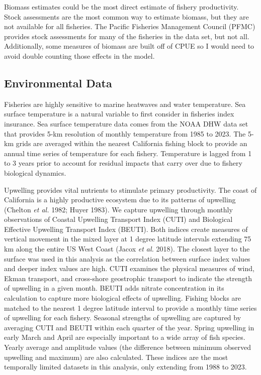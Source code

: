 \documentclass[
  letterpaper,
  DIV=11,
  numbers=noendperiod]{scrartcl}
\begin{document}
Biomass estimates could be the most direct estimate of fishery
productivity. Stock assessments are the most common way to estimate
biomass, but they are not available for all fisheries. The Pacific
Fisheries Management Council (PFMC) provides stock assessments for many
of the fisheries in the data set, but not all. Additionally, some
measures of biomass are built off of CPUE so I would need to avoid
double counting those effects in the model.

\hypertarget{environmental-data}{%
\subsection{Environmental Data}\label{environmental-data}}

Fisheries are highly sensitive to marine heatwaves and water
temperature. Sea surface temperature is a natural variable to first
consider in fisheries index insurance. Sea surface temperature data
comes from the NOAA DHW data set that provides 5-km resolution of
monthly temperature from 1985 to 2023. The 5-km grids are averaged
within the nearest California fishing block to provide an annual time
series of temperature for each fishery. Temperature is lagged from 1 to
3 years prior to account for residual impacts that carry over due to
fishery biological dynamics.

Upwelling provides vital nutrients to stimulate primary productivity.
The coast of California is a highly productive ecosystem due to its
patterns of upwelling (Chelton \emph{et al.} 1982; Huyer 1983). We
capture upwelling through monthly observations of Coastal Upwelling
Transport Index (CUTI) and Biological Effective Upwelling Transport
Index (BEUTI). Both indices create measures of vertical movement in the
mixed layer at 1 degree latitude intervals extending 75 km along the
entire US West Coast (Jacox \emph{et al.} 2018). The closest layer to
the surface was used in this analysis as the correlation between surface
index values and deeper index values are high. CUTI examines the
physical measures of wind, Ekman transport, and cross-shore geostrophic
transport to indicate the strength of upwelling in a given month. BEUTI
adds nitrate concentration in its calculation to capture more biological
effects of upwelling. Fishing blocks are matched to the nearest 1 degree
latitude interval to provide a monthly time series of upwelling for each
fishery. Seasonal strengths of upwelling are captured by averaging CUTI
and BEUTI within each quarter of the year. Spring upwelling in early
March and April are especially important to a wide array of fish
species. Yearly average and amplitude values (the difference between
minimum observed upwelling and maximum) are also calculated. These
indices are the most temporally limited datasets in this analysis, only
extending from 1988 to 2023.
\end{document}
